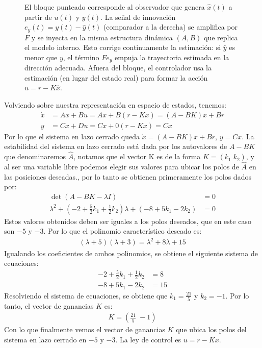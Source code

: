 \documentclass[
  11pt,
  letterpaper,
   addpoints,
  answers
  ]{exam}
\begin{document}
\begin{questions}
\begin{solution}
\begin{figure}[H]
    \caption{El bloque punteado corresponde al observador que genera $\hat x(t)$ a partir de $u(t)$ y $y(t)$. La señal de innovación $e_y(t)= y(t)-\hat y(t)$ (comparador a la derecha) se amplifica por $F$ y se inyecta en la misma estructura dinámica $(A, B)$ que replica el modelo interno. Esto corrige continuamente la estimación: si $\hat y$ es menor que $y$, el término $F e_y$ empuja la trayectoria estimada en la dirección adecuada. Afuera del bloque, el controlador usa la estimación (en lugar del estado real) para formar la acción $u = r - K\hat x$.}
  \end{figure}
  Volviendo sobre nuestra representación en espacio de estados, tenemos:
  \begin{align}
      \dot x &= Ax + Bu = Ax + B(r - Kx) = (A-BK)x + Br \\
      y &= Cx + Du = Cx + 0(r - Kx) = Cx
  \end{align}
  Por lo que el sistema en lazo cerrado queda $\dot x = (A-BK)x + Br$, $y = Cx$. La estabilidad del sistema en lazo cerrado está dada por los autovalores de $A-BK$ que denominaremos $\hat{A}$, notamos que el vector K es de la forma $K = (k_1 \; k_2)$, y al ser una variable libre podemos elegir sus valores para ubicar los polos de $\hat{A}$ en las posiciones deseadas., por lo tanto se obtienen primeramente los polos dados por:
  \begin{align}
    \det(A-BK -\lambda I) &= 0\\
    \lambda^{2} + \left(-2 + \frac{5}{2}k_1 + \frac{1}{2}k_2\right)\lambda + \left(-8 + 5k_1 - 2k_2\right) &= 0
  \end{align}
  Estos valores obtenidos deben ser iguales a los polos deseados, que en este caso son $-5$ y $-3$. Por lo que el polinomio característico deseado es:
  \begin{align}
    (\lambda + 5)(\lambda + 3) = \lambda^{2} + 8\lambda + 15
  \end{align}
  Igualando los coeficientes de ambos polinomios, se obtiene el siguiente sistema de ecuaciones:
  \begin{align}
    -2 + \frac{5}{2}k_1 + \frac{1}{2}k_2 &= 8 \\
    -8 + 5k_1 - 2k_2 &= 15
  \end{align}
  Resolviendo el sistema de ecuaciones, se obtiene que $k_1 = \frac{21}{5}$ y $k_2 = -1$. Por lo tanto, el vector de ganancias $K$ es:
  \begin{align}
    K = \left( \frac{21}{5} \; -1 \right)
  \end{align}
  Con lo que finalmente vemos el vector de ganancias $K$ que ubica los polos del sistema en lazo cerrado en $-5$ y $-3$. La ley de control es $u = r - Kx$.


\end{solution}
\end{questions}
\end{document}

